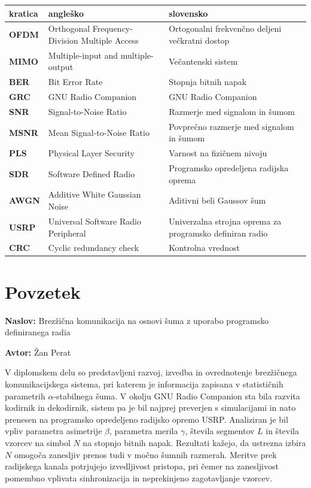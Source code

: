 \documentclass[a4paper, 12pt, openany]{book}
\newcommand{\ttitle}{Brezžična komunikacija na osnovi šuma z uporabo programsko definiranega radia}
\newcommand{\tauthor}{Žan Perat}
\newcommand{\clearemptydoublepage}{\newpage{\pagestyle{empty}\cleardoublepage}}
\begin{document}
\noindent\begin{tabular}{p{}|p{}|p{}}    %
  {\bf kratica} & {\bf angleško}                             & {\bf slovensko} \\ \hline
  {\bf OFDM} & Orthogonal Frequency-Division Multiple Access & Ortogonalni frekvenčno deljeni večkratni dostop \\
  {\bf MIMO} & Multiple-input and multiple-output & Večantenski sistem \\
  {\bf BER} & Bit Error Rate & Stopnja bitnih napak \\
  {\bf GRC} & GNU Radio Companion & GNU Radio Companion \\
  {\bf SNR} & Signal-to-Noise Ratio & Razmerje med signalom in šumom \\
  {\bf MSNR} & Mean Signal-to-Noise Ratio & Povprečno razmerje med signalom in šumom \\
  {\bf PLS} & Physical Layer Security & Varnost na fizičnem nivoju \\
  {\bf SDR} & Software Defined Radio & Programsko opredeljena radijska oprema \\
  {\bf AWGN} & Additive White Gaussian Noise& Aditivni beli Gaussov šum \\
  {\bf USRP} & Universal Software Radio Peripheral & Univerzalna strojna oprema za programsko definiran radio \\
  {\bf CRC} & Cyclic redundancy check & Kontrolna vrednost \\
\end{tabular}


\clearemptydoublepage

\chapter*{Povzetek}

\noindent\textbf{Naslov:} \ttitle
\bigskip

\noindent\textbf{Avtor:} \tauthor
\bigskip

\noindent V diplomskem delu so predstavljeni razvoj, izvedba in ovrednotenje brezžičnega komunikacijskega sistema, pri katerem je informacija zapisana v statističnih parametrih $\alpha$-stabilnega šuma. V okolju GNU Radio Companion sta bila razvita kodirnik in dekodirnik, sistem pa je bil najprej preverjen s simulacijami in nato prenesen na programsko opredeljeno radijsko opremo USRP. Analiziran je bil vpliv parametra asimetrije $\beta$, parametra merila $\gamma$, števila segmentov $L$ in števila vzorcev na simbol $N$ na stopnjo bitnih napak. Rezultati kažejo, da ustrezna izbira $N$ omogoča zanesljiv prenos tudi v močno šumnih razmerah. Meritve prek radijskega kanala potrjujejo izvedljivost pristopa, pri čemer na zanesljivost pomembno vplivata sinhronizacija in neprekinjeno zagotavljanje vzorcev.
\end{document}
